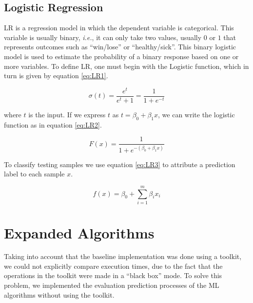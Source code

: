 \subsection{Logistic Regression}
\label{ssec:LogisticRegression}


\ac{LR} is a regression model in which the dependent variable is categorical. This variable is usually binary, \textit{i.e.}, it can only take two values, usually $0$ or $1$ that represents outcomes such as ``win/lose'' or ``healthy/sick''.
This binary logistic model is used to estimate the probability of a binary response based on one or more variables.
To define \ac{LR}, one must begin with the Logistic function, which in turn is given by equation \ref{eq:LR1}.

\begin{equation}
\label{eq:LR1}
\sigma (t)={\frac {e^{t}}{e^{t}+1}}={\frac {1}{1+e^{-t}}}
\end{equation}

where $t$ is the input. If we express $t$ as $t=\beta _{0}+\beta _{1}x$, we can write the logistic function as in equation \ref{eq:LR2}.

\begin{equation}
\label{eq:LR2}
F(x)={\frac {1}{1+e^{-(\beta _{0}+\beta _{1}x)}}}
\end{equation}


To classify testing samples we use equation \ref{eq:LR3} to attribute a prediction label to each sample $x$.

\begin{equation}
\label{eq:LR3}
f(x)=\beta_0+\sum_{i=1}^m \beta_i x_i
\end{equation}

\section{Expanded Algorithms}
\label{sec:ExpandedAlgorithmsImplementation}



Taking into account that the baseline implementation was done using a toolkit, we could not explicitly compare execution times, due to the fact that the operations in the toolkit were made in a ``black box'' mode. To solve this problem, we implemented the evaluation prediction processes of the \ac{ML} algorithms without using the toolkit.

